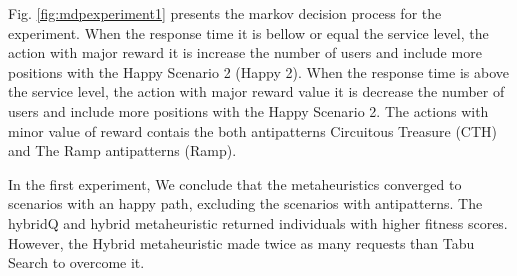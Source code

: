 Fig. \ref{fig:mdpexperiment1} presents the markov decision process for the experiment. When the response time it is bellow or equal the service level, the action with major reward it is increase the number of users and include more positions with the Happy Scenario 2 (Happy 2). When the response time is above the service level, the action with major reward value it is decrease the number of users and include more positions with the Happy Scenario 2. The actions  with minor value of reward contais the both antipatterns Circuitous Treasure (CTH) and The Ramp antipatterns (Ramp).

In the first experiment, We conclude that the metaheuristics converged to scenarios with an happy path, excluding the scenarios with antipatterns. The hybridQ and hybrid metaheuristic returned individuals with higher fitness scores. However, the Hybrid metaheuristic made twice as many requests than Tabu Search to overcome it. 

